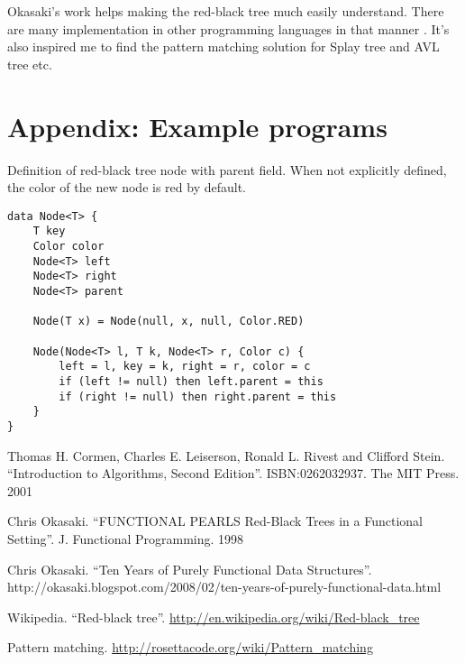 \documentclass[b5paper]{article}
\begin{document}
Okasaki's work helps making the red-black tree much easily understand.
There are many implementation in other programming languages in that
manner \cite{rosetta}. It's also inspired me to find the pattern matching
solution for Splay tree and AVL tree etc.

\section{Appendix: Example programs}

Definition of red-black tree node with parent field. When not explicitly defined, the color of the new node is red by default.

\begin{lstlisting}[language = Bourbaki]
data Node<T> {
    T key
    Color color
    Node<T> left
    Node<T> right
    Node<T> parent

    Node(T x) = Node(null, x, null, Color.RED)

    Node(Node<T> l, T k, Node<T> r, Color c) {
        left = l, key = k, right = r, color = c
        if (left != null) then left.parent = this
        if (right != null) then right.parent = this
    }
}
\end{lstlisting}

\begin{thebibliography}{99}

Thomas H. Cormen, Charles E. Leiserson, Ronald L. Rivest and Clifford Stein.
``Introduction to Algorithms, Second Edition''. ISBN:0262032937. The MIT Press. 2001

Chris Okasaki. ``FUNCTIONAL PEARLS Red-Black Trees in a Functional Setting''. J. Functional Programming. 1998

Chris Okasaki. ``Ten Years of Purely Functional Data Structures''. http://okasaki.blogspot.com/2008/02/ten-years-of-purely-functional-data.html

Wikipedia. ``Red-black tree''. \url{http://en.wikipedia.org/wiki/Red-black\_tree}

Pattern matching. \url{http://rosettacode.org/wiki/Pattern\_matching}

\end{thebibliography}

\ifx\wholebook\relax\else
\end{document}
